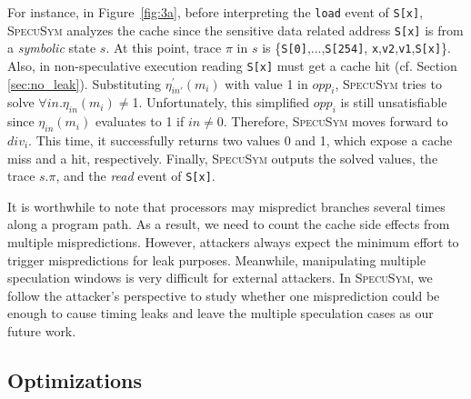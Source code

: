 \documentclass[sigconf,screen]{acmart}
\newcommand{\SpecuSym}{\textsc{SpecuSym} }
\begin{document}
For instance, in Figure~\ref{fig:3a}, before interpreting the \texttt{load} 
event of \texttt{S[x]}, \SpecuSym analyzes the cache since the sensitive 
data related address {\texttt{S[x]}} is from a \textit{symbolic} state $s$. 
At this point, trace $\pi$ in $s$ is {\{\texttt{S[0]},...,\texttt{S[254]},
\texttt{x},\texttt{v2},\texttt{v1},\texttt{S[x]}\}}. Also, in non-speculative 
execution reading {\small\texttt{S[x]}} must get a cache hit (cf. Section
\ref{sec:no_leak}). Substituting $\mathit{\eta_{in'}^\prime(m_i)}$ with value 
1 in $\mathit{opp_i}$, \SpecuSym tries to solve 
$\forall\mathit{in}.\mathit{\eta_{in}(m_i)\neq}$1. 
Unfortunately, this simplified $\mathit{opp_i}$ is still unsatisfiable since 
$\mathit{\eta_{in}(m_i)}$ evaluates to 1 if $\mathit{in}\neq0$. Therefore, 
\SpecuSym moves forward to $\mathit{div_i}$. This time, it successfully returns 
two values 0 and 1, which expose a cache miss and a hit, respectively. Finally, 
\SpecuSym outputs the solved values, the trace $s.\pi$, and the \textit{read} 
event of {\texttt{S[x]}}.


It is worthwhile to note that processors may mispredict branches several times 
along a program path. As a result, we need to count the cache side effects 
from multiple mispredictions. However, attackers always expect the minimum 
effort to trigger mispredictions for leak purposes. Meanwhile, manipulating 
multiple speculation windows is very difficult for external attackers. In 
\textsc{SpecuSym}, we follow the attacker's perspective to study whether one 
misprediction could be enough to cause timing leaks and leave the multiple 
speculation cases as our future work. 



\subsection{Optimizations}
\label{sec:optimize}
\end{document}
